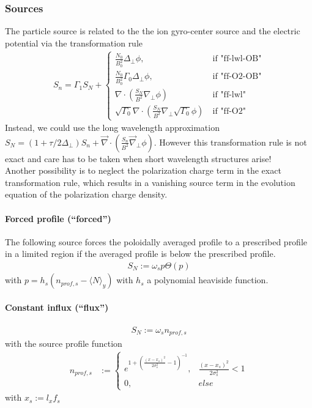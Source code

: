 \subsubsection{Sources}
The particle source is related to the the ion gyro-center source 
and the electric potential via the transformation rule
\begin{align}
 S_n =\Gamma_1 S_N +
 \begin{cases}
\frac{N_0}{B_0^2}\Delta_{\perp} \phi , 
        &\ \text{if "ff-lwl-OB"} \\
\frac{N_0}{B_0^2}\Gamma_0\Delta_{\perp} \phi, 
      &\ \text{if "ff-O2-OB"} \\
\nabla\cdot \left(\frac{S_N}{B^2} \nabla_\perp \phi\right)
       &\ \text{if "ff-lwl"} \\
\sqrt{\Gamma_0}\nabla\cdot \left(\frac{S_N}{B^2} \nabla_\perp\sqrt{\Gamma_0} 
\phi\right) 
         &\ \text{if "ff-O2"} 
\end{cases}
\end{align}
Instead, we could use the long wavelength approximation \(
S_N =(1+\tau/2 \Delta_\perp) S_n + \vec{\nabla} \cdot \left(\frac{S_n}{B^2} 
\vec{\nabla}_\perp \phi\right)\). However this transformation rule is not exact 
and care has to be taken when short wavelength structures arise! \\
Another possibility is to neglect the polarization charge term in the exact transformation rule, which results in a vanishing source term in the evolution equation of the polarization charge density.
\paragraph{Forced profile (``forced'')}
The following source forces the poloidally averaged profile to a prescribed profile in a limited region if the averaged profile is below the prescribed profile. 
\begin{align}
 S_N := \omega_s p \Theta\left(p \right)
\end{align}
with \(p = h_s (n_{prof,s} - \langle N \rangle_y)\) with \(h_s\) a polynomial heaviside function.

\paragraph{Constant influx (``flux'')}
\begin{align}
 S_N := \omega_s n_{prof,s} 
\end{align}
with the source profile function 
\begin{align}
 n_{prof,s}&:= 
 \begin{cases}
   e^{1+\left(\frac{(x-x_s)^2}{2 \sigma_s^2}-1\right)^{-1}}, &\frac{(x-x_s)^2}{2 
\sigma_s^2}<1  \\
   0, & else
 \end{cases}
\end{align}
with \(x_s:= l_x  f_s\)
